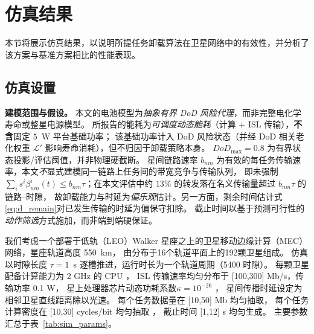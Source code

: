 \documentclass[a4paper,11pt]{article}
\begin{document}
\section{仿真结果}
\label{sec:simulation}
本节将展示仿真结果，以说明所提任务卸载算法在卫星网络中的有效性，并分析了该方案与基准方案相比的性能表现。
\subsection{仿真设置}
\label{subsec:sim_setup}

\noindent\textbf{建模范围与假设。}
本文的电池模型为\emph{抽象有界 DoD 风险代理}，而非完整电化学寿命或整星电源模型。
所报告的能耗为\emph{可调度动态能耗}（计算 $+$ ISL 传输），\textbf{不含}固定 $5$~W 平台基础功率；
该基础功率计入 DoD 风险状态（并经 DoD 相关老化权重 $\mathcal{L}'$ 影响寿命消耗），但不归因于卸载策略本身。
$DoD_{\max}=0.8$ 为有界状态投影/评估阈值，并非物理硬截断。
星间链路速率 $b_{nm}$ 为有效的每任务传输速率，本文\emph{不}显式建模同一链路上任务间的带宽竞争与传输队列，
即未强制 $\sum_i s^i\beta^i_{nm}(t)\le b_{nm}\tau$；在本文评估中约 $13\%$ 的转发落在名义传输量超过 $b_{nm}\tau$ 的链路--时隙，
故卸载能力与时延为\emph{偏乐观}估计。另一方面，剩余时间估计式\eqref{eq:d_remain}对已发生传输的时延为偏保守扣除。
截止时间以基于预测可行性的\emph{动作筛选}方式施加，而非端到端硬保证。


我们考虑一个部署于低轨（LEO）Walker 星座之上的卫星移动边缘计算（MEC）网络，星座轨道高度 550~km，
由分布于16个轨道平面上的192颗卫星组成。
仿真以时隙长度 $\tau=1$~s
逐槽推进，运行时长为一个轨道周期（5400 时隙）。
每颗卫星配备计算能力为 2 GHz 的 CPU \cite{zhang2024mhspo}，
ISL 传输速率均匀分布于 [100,300] Mb/s，传输功率 0.1 W，
星上处理器芯片动态功耗系数$\kappa=10^{-26}$ \cite{zhang2024mhspo}，
星间传播时延设定为相邻卫星直线距离除以光速。
每个任务数据量在 [10,50] Mb 均匀抽取，
每个任务计算密度在 [10,30] cycles/bit 均匀抽取 \cite{zhang2024mhspo}，
截止时间 [1,12] s 均匀生成。
主要参数汇总于表~\ref{tab:sim_params}。
\end{document}
